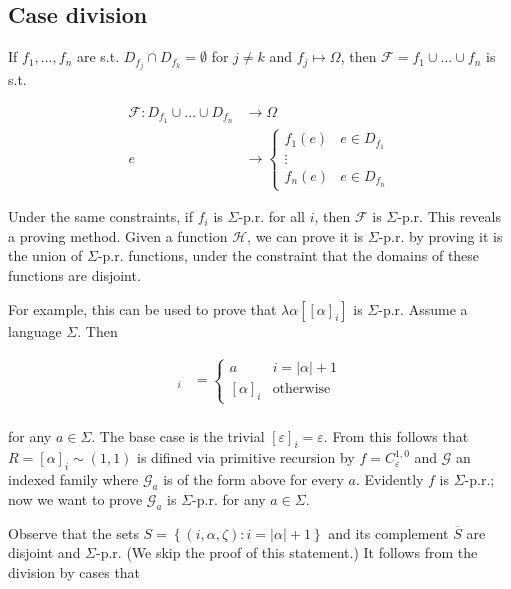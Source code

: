 \documentclass[a4paper, 12pt]{article}
\begin{document}
\subsection{Case division}

If $f_1, \ldots, f_n$ are s.t. $D_{f_j} \cap D_{f_k} = \emptyset$ for $j \neq k$
and $f_j \mapsto \Omega$, then $\mathcal{F} = f_1 \cup \ldots \cup f_n$ is s.t. 

\begin{align*}
    \mathcal{F} : D_{f_1} \cup \ldots \cup D_{f_n} &\to \Omega \\
    e &\to \begin{cases}
        f_1(e) & e \in D_{f_1} \\ 
               \vdots \\ 
        f_n(e) & e \in D_{f_n}
    \end{cases}
\end{align*}

Under the same constraints, if $f_i$ is $\Sigma$-p.r. for all $i$, then
$\mathcal{F}$ is $\Sigma$-p.r. This reveals a proving method. Given a function
$\mathcal{H}$, we can prove it is $\Sigma$-p.r. by proving it is the union of
$\Sigma$-p.r. functions, under the constraint that the domains of these
functions are disjoint.

For example, this can be used to prove that $\lambda \alpha\left[ \left[ \alpha
\right]_i  \right] $ is $\Sigma$-p.r. Assume a language $\Sigma$. Then

\begin{align*}
    [\alpha a]_i &= \begin{cases}
        a & i = |\alpha| + 1 \\ 
        [\alpha]_i & \text{otherwise}
    \end{cases}\\
\end{align*}

for any $a \in \Sigma$. The base case is the trivial $[\varepsilon]_i = \varepsilon$.
From this follows  that $R = [\alpha]_i \sim (1, 1)$ is difined via primitive recursion by
$f = C_{\varepsilon}^{1, 0}$ and $\mathcal{G}$ an indexed family where
$\mathcal{G}_a$ is of the form above for every $a$. Evidently $f$ is
$\Sigma$-p.r.; now we want to prove $\mathcal{G}_a$ is $\Sigma$-p.r. for any $a
\in \Sigma$.


Observe that the sets $S = \left\{ (i, \alpha, \zeta) : i = |\alpha| + 1 \right\} $
and its complement $\overline{S}$ are disjoint and $\Sigma$-p.r. (We skip the
proof of this statement.) It follows from the division by cases that
\end{document}
